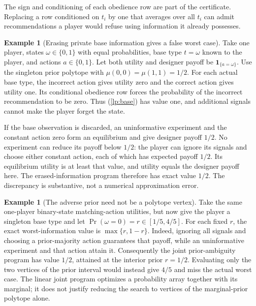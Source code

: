 \documentclass[11pt]{article}
\theoremstyle{definition}
\newtheorem{example}[theorem]{Example}
\theoremstyle{remark}
\begin{document}
The sign and conditioning of each obedience row are part of the
certificate. Replacing a row conditioned on $t_i$ by one that averages
over all $t_i$ can admit recommendations a player would refuse using
information it already possesses.

\begin{example}[Erasing private base information gives a false worst case]
Take one player, states $\omega\in\{0,1\}$ with equal probabilities,
base type $t=\omega$ known to the player, and actions $a\in\{0,1\}$.
Let both utility and designer payoff be $\mathbf1_{\{a=\omega\}}$.
Use the singleton prior polytope with
$\mu(0,0)=\mu(1,1)=1/2$. For each actual base type, the incorrect
action gives utility zero and the correct action gives utility one.
Its conditional obedience row forces the probability of the incorrect
recommendation to be zero. Thus (\ref{lp:base}) has value one, and
additional signals cannot make the player forget the state.

If the base observation is discarded, an uninformative experiment
and the constant action zero form an equilibrium and give designer
payoff $1/2$. No experiment can reduce its payoff below $1/2$:
the player can ignore its signals and choose either constant action,
each of which has expected payoff $1/2$. Its equilibrium utility is
at least that value, and utility equals the designer payoff here.
The erased-information program therefore has exact value $1/2$.
The discrepancy is substantive, not a numerical approximation error.
\end{example}

\begin{example}[The adverse prior need not be a polytope vertex]
Take the same one-player binary-state matching-action utilities, but
now give the player a singleton base type and let
$\Pr(\omega=0)=r\in[1/5,4/5]$. For each fixed $r$, the exact
worst-information value is $\max\{r,1-r\}$. Indeed, ignoring all
signals and choosing a prior-majority action guarantees that payoff,
while an uninformative experiment and that action attain it.
Consequently the joint prior-ambiguity program has value $1/2$, attained
at the interior prior $r=1/2$. Evaluating only the two vertices of the
prior interval would instead give $4/5$ and miss the actual worst case.
The linear joint program optimizes a probability array together with
its marginal; it does not justify reducing the search to vertices of
the marginal-prior polytope alone.
\end{example}
\end{document}
